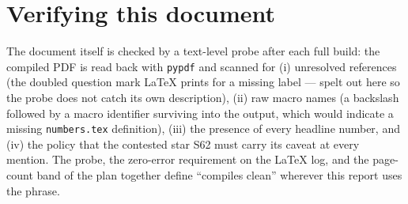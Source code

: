 \section*{Verifying this document}

The document itself is checked by a text-level probe after each full
build: the compiled PDF is read back with \texttt{pypdf} and scanned
for (i) unresolved references (the doubled question mark \LaTeX{}
prints for a missing label — spelt out here so the probe does not
catch its own description), (ii) raw macro
names (a backslash followed by a macro identifier surviving into the
output, which would indicate a missing \texttt{numbers.tex}
definition), (iii) the presence of every headline number, and (iv) the
policy that the contested star S62 must carry its caveat at every
mention. The probe, the zero-error requirement on the
\LaTeX{} log, and the page-count band of the plan together define
``compiles clean'' wherever this report uses the phrase.
